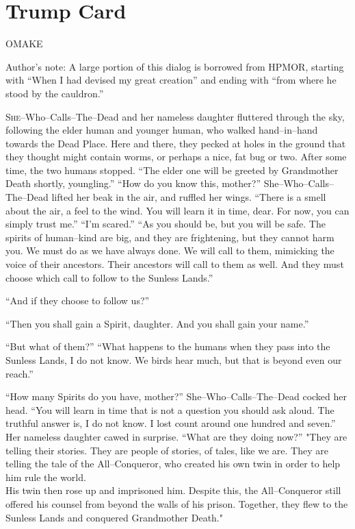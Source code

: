 \chapter*{Trump Card}
\begin{center} \chapnumfont OMAKE \end{center}
\SomeVSpace
\SomeVSpace
\SomeVSpace
\small Author’s note:
A large portion of this dialog is borrowed from HPMOR, starting with “When I had devised my great creation{\el}” and ending with “{\el}from where he stood by the cauldron.” \normalsize
\simpleline
{}

\lettrine{S}{he}\mbox{--}Who\mbox{--}Calls\mbox{--}The\mbox{--}Dead and her nameless daughter fluttered through the sky, following the elder human and younger human, who walked hand\mbox{--}in\mbox{--}hand towards the Dead Place. Here and there, they pecked at holes in the ground that they thought might contain worms, or perhaps a nice, fat bug or two. After some time, the two humans stopped.
\SmallVSpace
“The elder one will be greeted by Grandmother Death shortly, youngling.”
\SmallVSpace
“How do you know this, mother?”
\SmallVSpace
She\mbox{--}Who\mbox{--}Calls\mbox{--}The\mbox{--}Dead lifted her beak in the air, and ruffled her wings. “There is a smell about the air, a feel to the wind. You will learn it in time, dear. For now, you can simply trust me.”
\SmallVSpace
“I’m scared.”
\SmallVSpace
“As you should be, but you will be safe. The spirits of human\mbox{--}kind are big, and they are frightening, but they cannot harm you. We must do as we have always done. We will call to them, mimicking the voice of their ancestors. Their ancestors will call to them as well. And they must choose which call to follow to the Sunless Lands.”

“And if they choose to follow us?”

“Then you shall gain a Spirit, daughter. And you shall gain your name.”

“But what of them?”
\SmallVSpace
“What happens to the humans when they pass into the Sunless Lands, I do not know. We birds hear much, but that is beyond even our reach.”

“How many Spirits do you have, mother?”
\SmallVSpace
She\mbox{--}Who\mbox{--}Calls\mbox{--}The\mbox{--}Dead cocked her head. “You will learn in time that is not a question you should ask aloud. The truthful answer is, I do not know. I lost count around one hundred and seven.”
\SmallVSpace
Her nameless daughter cawed in surprise. “What are they doing now?”
\SmallVSpace
"They are telling their stories. They are people of stories, of tales, like we are. They are telling the tale of the All\mbox{--}Conqueror, who created his own twin in order to help him rule the world.\\His twin then rose up and imprisoned him. Despite this, the All\mbox{--}Conqueror still offered his counsel from beyond the walls of his prison. Together, they flew to the Sunless Lands and conquered Grandmother Death."


